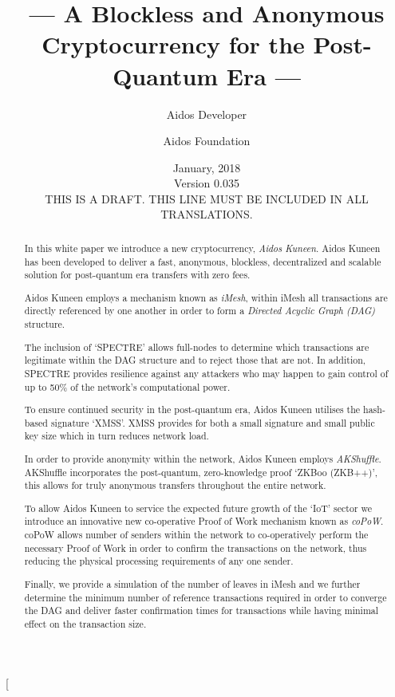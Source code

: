 \documentclass[a4paper,10pt,twocolumn]{article}
\title{--- A Blockless and Anonymous Cryptocurrency for the Post-Quantum Era ---}
\author{
	Aidos Developer \and Aidos Foundation
}
\date{January, 2018 \\ Version 0.035\\ THIS IS A DRAFT\@. THIS LINE MUST BE INCLUDED IN ALL TRANSLATIONS.}
\begin{document}
\twocolumn[
	\maketitle

\begin{abstract}
		In this white paper we introduce a new cryptocurrency, \emph{Aidos Kuneen}. Aidos Kuneen has been developed to deliver a 
		fast, anonymous, blockless, decentralized and scalable solution for post-quantum era transfers with zero fees. 
		
		Aidos Kuneen employs a mechanism known as \emph{iMesh}, within iMesh all transactions are directly referenced by
		one another in order to form a \emph{Directed Acyclic Graph (DAG)} structure.
		
		The inclusion of `SPECTRE' allows full-nodes to determine which transactions are legitimate within the DAG structure and
		to reject those that are not. In addition, SPECTRE provides resilience against any attackers who may happen to gain 
		control of up to 50\% of the network's computational power.
		
		To ensure continued security in the post-quantum era, Aidos Kuneen utilises the hash-based signature `XMSS'. XMSS
		provides for both a small signature and small public key size which in turn reduces network load.
	
		In order to provide anonymity within the network, Aidos Kuneen employs \emph{AKShuffle}. AKShuffle 	
		incorporates the post-quantum, zero-knowledge proof `ZKBoo (ZKB++)', this allows for truly anonymous transfers 
		throughout the entire network.
		
		To allow Aidos Kuneen to service the expected future growth of the `IoT' sector we introduce an innovative new 
		co-operative Proof of Work mechanism known as \emph{coPoW}\@. coPoW allows number of senders within the network to 
		co-operatively perform the necessary Proof of Work in order to confirm the transactions on the network, thus reducing 
		the physical processing requirements of any one sender.
		
		Finally, we provide a simulation of the number of leaves in iMesh and we further determine the minimum number of 
		reference transactions required in order to converge the DAG and deliver faster confirmation times for transactions 
		while having minimal effect on the transaction size.
		
		\end{abstract}

		\vspace{0.5cm}
\end{document}
